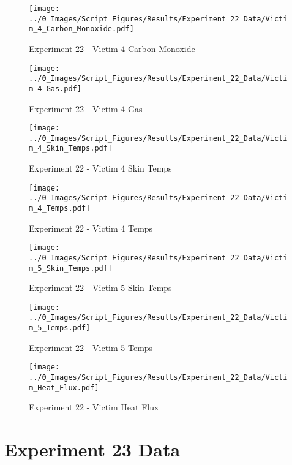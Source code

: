 	\begin{figure}[H]
		\centering
		\texttt{[image: ../0\_Images/Script\_Figures/Results/Experiment\_22\_Data/Victim\_4\_Carbon\_Monoxide.pdf]}
		\caption[]{Experiment 22 - Victim 4 Carbon Monoxide}
	\end{figure}
 
	\clearpage

	\begin{figure}[H]
		\centering
		\texttt{[image: ../0\_Images/Script\_Figures/Results/Experiment\_22\_Data/Victim\_4\_Gas.pdf]}
		\caption[]{Experiment 22 - Victim 4 Gas}
	\end{figure}
 

	\begin{figure}[H]
		\centering
		\texttt{[image: ../0\_Images/Script\_Figures/Results/Experiment\_22\_Data/Victim\_4\_Skin\_Temps.pdf]}
		\caption[]{Experiment 22 - Victim 4 Skin Temps}
	\end{figure}
 
	\clearpage

	\begin{figure}[H]
		\centering
		\texttt{[image: ../0\_Images/Script\_Figures/Results/Experiment\_22\_Data/Victim\_4\_Temps.pdf]}
		\caption[]{Experiment 22 - Victim 4 Temps}
	\end{figure}
 

	\begin{figure}[H]
		\centering
		\texttt{[image: ../0\_Images/Script\_Figures/Results/Experiment\_22\_Data/Victim\_5\_Skin\_Temps.pdf]}
		\caption[]{Experiment 22 - Victim 5 Skin Temps}
	\end{figure}
 
	\clearpage

	\begin{figure}[H]
		\centering
		\texttt{[image: ../0\_Images/Script\_Figures/Results/Experiment\_22\_Data/Victim\_5\_Temps.pdf]}
		\caption[]{Experiment 22 - Victim 5 Temps}
	\end{figure}
 

	\begin{figure}[H]
		\centering
		\texttt{[image: ../0\_Images/Script\_Figures/Results/Experiment\_22\_Data/Victim\_Heat\_Flux.pdf]}
		\caption[]{Experiment 22 - Victim Heat Flux}
	\end{figure}
 
	\clearpage

\clearpage		\large
\section{Experiment 23 Data} \label{App:Exp23Results} 

